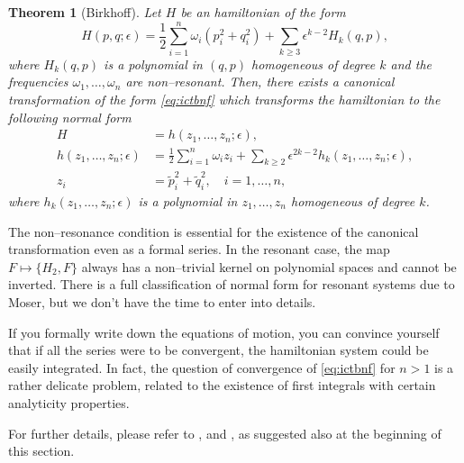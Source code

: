 \documentclass[english,fontsize=11pt,paper=a5,oneside]{scrbook}
\newtheorem{theorem}{Theorem}[chapter]
\theoremstyle{definition}
\begin{document}
\begin{theorem}[Birkhoff]
    Let $H$ be an hamiltonian of the form
    \begin{equation}
        H(p,q; \epsilon) = \frac12 \sum_{i=1}^n \omega_i(p_i^2 + q_i^2) + \sum_{k\geq 3} \epsilon^{k-2} H_k(q,p),
    \end{equation}
    where $H_k(q,p)$ is a polynomial in $(q,p)$ homogeneous of degree $k$ and the frequencies $\omega_1,\ldots,\omega_n$ are non--resonant.
    Then, there exists a canonical transformation of the form \eqref{eq:ictbnf} which transforms the hamiltonian to the following normal form
    \begin{align}
        H &= h(z_1, \ldots, z_n; \epsilon),\\
        h(z_1,\ldots,z_n;\epsilon) &= \frac12 \sum_{i=1}^n \omega_i z_i + \sum_{k\geq 2} \epsilon^{2k-2} h_k(z_1, \ldots, z_n; \epsilon),\\
        z_i &= \tilde p_i^2 + \tilde q_i^2,\quad i=1,\ldots,n,
    \end{align}
    where $h_k(z_1, \ldots, z_n; \epsilon)$ is a polynomial in $z_1, \ldots, z_n$ homogeneous of degree $k$.
\end{theorem}

The non--resonance condition is essential for the existence of the canonical transformation even as a formal series. In the resonant case, the map $F \mapsto \big\{H_2, F\big\}$ always has a non--trivial kernel on polynomial spaces and cannot be inverted.
There is a full classification of normal form for resonant systems due to Moser, but we don't have the time to enter into details.

If you formally write down the equations of motion, you can convince yourself that if all the series were to be convergent, the hamiltonian system could be easily integrated.
In fact, the question of convergence of \eqref{eq:ictbnf} for $n>1$ is a rather delicate problem, related to the existence of first integrals with certain analyticity properties.

For further details, please refer to \cite[Chapter 6.5]{book:celletti}, \cite[Chapter 8.3]{book:arnoldcelestial} and \cite[Chapters 15.2 and 15.3]{book:knauf}, as suggested also at the beginning of this section.

\end{document}

